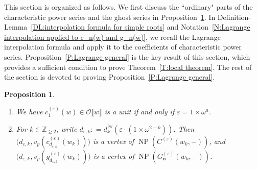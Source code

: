 \documentclass[12pt]{amsart}
\newtheorem{proposition}[subsection]{Proposition}
\theoremstyle{definition}
\numberwithin{equation}{subsection}
\def\calO{\mathcal{O}}
\def\ZZ{\mathbb{Z}}
\DeclareMathOperator{\NP}{NP}
\newcommand{\bbsigma}{\boldsymbol{\sigma}}
\newcommand{\Iw}{\mathrm{Iw}}
\begin{document}
\medskip
This section is organized as follows. We first discuss the ``ordinary" parts of the characteristic power series and the ghost series in Proposition~\ref{P:simple ghost}. In Definition-Lemma~\ref{DL:interpolation formula for simple roots} and Notation~\ref{N:Lagrange interpolation applied to c_n(w) and g_n(w)}, we recall the Lagrange interpolation formula and apply it to the coefficients of characteristic power series. Proposition~\ref{P:Lagrange general} is the key result of this section, which provides a sufficient condition to prove Theorem~\ref{T:local theorem}. The rest of the section is devoted to proving Proposition~\ref{P:Lagrange general}.
\begin{proposition}
\label{P:simple ghost}
\begin{enumerate}
\item We have $c_1^{(\varepsilon)}(w) \in \calO\llbracket w\rrbracket$ is a unit if and only if $\varepsilon = 1 \times \omega^a$.
\item For $k \in \ZZ_{\geq 2}$, write $d_{\varepsilon, k}: = d_k^\Iw(\varepsilon\cdot (1\times \omega^{2-k}))$. Then $\big(d_{\varepsilon,k}, v_p(c_{d_{\varepsilon,k}}^{(\varepsilon)}(w_k))\big)$ is a vertex of $\NP(C^{(\varepsilon)}(w_k, -))$, and $\big(d_{\varepsilon,k}, v_p(g_{d_{\varepsilon,k}}^{(\varepsilon)}(w_k))\big)$ is a vertex of $\NP(G_{\bbsigma}^{(\varepsilon)}(w_k, -))$.

\end{enumerate}
\end{proposition}
\end{document}
